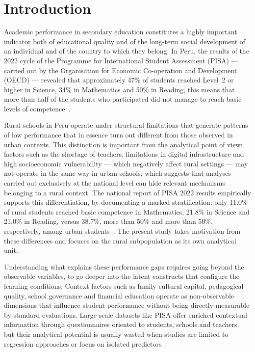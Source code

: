 \documentclass[runningheads]{llncs}
\begin{document}
\section{Introduction}

Academic performance in secondary education constitutes a highly
important indicator both of educational quality and of the
long-term social development of an individual and of the country
to which they belong. In Peru, the results of the 2022 cycle of
the Programme for International Student Assessment (PISA) ---
carried out by the Organisation for Economic Co-operation and
Development (OECD) --- revealed that approximately 47\% of
students reached Level~2 or higher in Science, 34\% in
Mathematics and 50\% in Reading, this means that more than half
of the students who participated did not manage to reach basic
levels of competence~\cite{oecd2023pisaPeru}.

Rural schools in Peru operate under structural limitations that
generate patterns of low performance that in essence turn out
different from those observed in urban contexts. This
distinction is important from the analytical point of view:
factors such as the shortage of teachers, limitations in digital
infrastructure and high socioeconomic vulnerability --- which
negatively affect rural settings --- may not operate in the same
way in urban schools, which suggests that analyses carried out
exclusively at the national level can hide relevant mechanisms
belonging to a rural context. The national report of PISA 2022
results empirically supports this differentiation, by
documenting a marked stratification: only 11.0\% of rural
students reached basic competence in Mathematics, 21.8\% in
Science and 21.0\% in Reading, versus 38.7\%, more than 50\% and
more than 50\%, respectively, among urban
students~\cite{minedu2024pisareporte}. The present study takes
motivation from these differences and focuses on the rural
subpopulation as its own analytical unit.

Understanding what explains these performance gaps requires
going beyond the observable variables, to go deeper into the
latent constructs that configure the learning conditions.
Context factors such as family cultural capital, pedagogical
quality, school governance and financial education operate as
non-observable dimensions that influence student performance
without being directly measurable by standard evaluations.
Large-scale datasets like PISA offer enriched contextual
information through questionnaires oriented to students, schools
and teachers, but their analytical potential is usually wasted
when studies are limited to regression approaches or focus on
isolated predictors~\cite{rutkowski2010secondary}.
\end{document}
